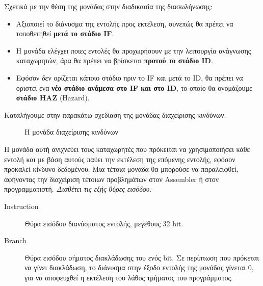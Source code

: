 \documentclass[11pt]{extarticle}
\begin{document}
Σχετικά με την θέση της μονάδας στην διαδικασία της διασωλήνωσης:
 \begin{itemize}
    \item Αξιοποιεί το διάνυσμα της εντολής προς εκτέλεση, συνεπώς θα πρέπει να τοποθετηθεί \textbf{μετά το στάδιο IF}.
    \item Η μονάδα ελέγχει ποιες εντολές θα προχωρήσουν με την λειτουργία ανάγνωσης καταχωρητών, άρα θα πρέπει να βρίσκεται \textbf{προτού το στάδιο ID}.
    \item Εφόσον δεν ορίζεται κάποιο στάδιο πριν το IF και μετά το ID, θα πρέπει να οριστεί ένα \textbf{νέο στάδιο ανάμεσα στο IF και στο ID}, το οποίο θα ονομάζουμε \textbf{στάδιο ΗΑΖ} (Hazard).
 \end{itemize}
\newpage
Καταλήγουμε στην παρακάτω σχεδίαση της μονάδας διαχείρισης κινδύνων:
\begin{figure}[H]
    \centering
    \caption[Μονάδα Διαχείρισης Κινδύνων]{Η μονάδα διαχείρισης κινδύνων}
\end{figure}
Η μονάδα αυτή ανιχνεύει τους καταχωρητές που πρόκειται να χρησιμοποιήσει κάθε εντολή και με βάση αυτούς παύει την εκτέλεση της επόμενης εντολής, εφόσον προκαλεί κίνδυνο δεδομένου.
 Μια τέτοια μονάδα θα μπορούσε να παραλειφθεί, αφήνοντας την διαχείριση τέτοιων προβλημάτων στον Assembler ή στον προγραμματιστή\footnotemark.
\vspace{1em}
\newline
\textit{Διαθέτει τις εξής θύρες εισόδου:}
\begin{description}
 \item[Instruction] Θύρα εισόδου διανύσματος εντολής, μεγέθους 32 bit.
 \item[Branch] Θύρα εισόδου σήματος διακλάδωσης του ενός bit. \newline
 Σε περίπτωση που πρόκεται να γίνει διακλάδωση, το διάνυσμα στην έξοδο εντολής της μονάδας γίνεται 0, για να αποφευχθεί η εκτέλεση του λάθος τμήματος του προγράμματος.
\end{description}
\end{document}
